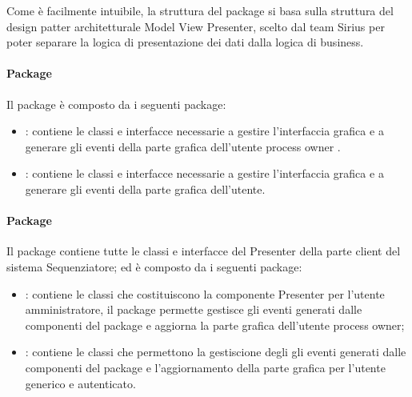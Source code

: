 Come è facilmente intuibile, la struttura del package \client{} si basa sulla struttura del design patter
architetturale Model View Presenter, scelto dal team Sirius per poter separare la logica di presentazione dei dati dalla logica di business.\\

\paragraph{Package \view{}}
Il package \view{} è composto da i seguenti package:
\begin{itemize}
	\item \viewAdmin{}: contiene le classi e interfacce necessarie a gestire 
l’interfaccia grafica e a generare gli eventi della parte grafica dell'utente process owner .
	\item \viewUser{}: contiene le classi e interfacce necessarie a gestire l’interfaccia
grafica e a generare gli eventi della parte grafica dell’utente.
\end{itemize}
\paragraph{Package \logic{}}
Il package \logic{} contiene tutte le classi e interfacce del Presenter della 
parte client del sistema Sequenziatore; ed è composto da i seguenti package:
\begin{itemize}
	\item \logicAdmin{}: contiene le classi che costituiscono la componente Presenter
per l’utente amministratore, il package \logicAdmin{} permette gestisce gli eventi generati dalle componenti del package \viewAdmin{} e 
aggiorna la parte grafica dell'utente process owner;
	\item \logicUser{}: contiene le classi che permettono la gestiscione degli gli eventi generati dalle componenti del package
\viewUser{} e l'aggiornamento della parte grafica per l'utente generico e autenticato.
\end{itemize}
